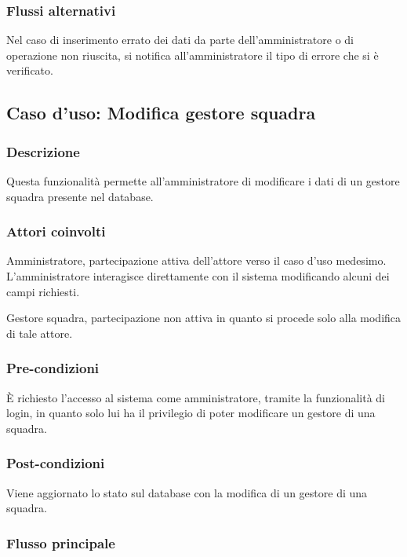 \subsubsection*{Flussi alternativi}
Nel caso di inserimento errato dei dati da parte dell'amministratore o di operazione non riuscita, si notifica all'amministratore il tipo di errore che si è verificato.


%
%
\subsection{Caso d'uso: Modifica gestore squadra}

\subsubsection*{Descrizione}
Questa funzionalità permette all'amministratore di modificare i dati di un gestore squadra presente nel database.

\subsubsection*{Attori coinvolti}
Amministratore, partecipazione attiva dell'attore verso il caso d'uso medesimo.
L'amministratore interagisce direttamente con il sistema modificando alcuni dei campi richiesti.

Gestore squadra, partecipazione non attiva in quanto si procede solo alla modifica di tale attore.

\subsubsection*{Pre-condizioni}
È richiesto l'accesso al sistema come amministratore, tramite la funzionalità di login, in quanto solo lui ha il privilegio di poter modificare un gestore di una squadra.

\subsubsection*{Post-condizioni}
Viene aggiornato lo stato sul database con la modifica di un  gestore di una squadra.

\subsubsection*{Flusso principale}

